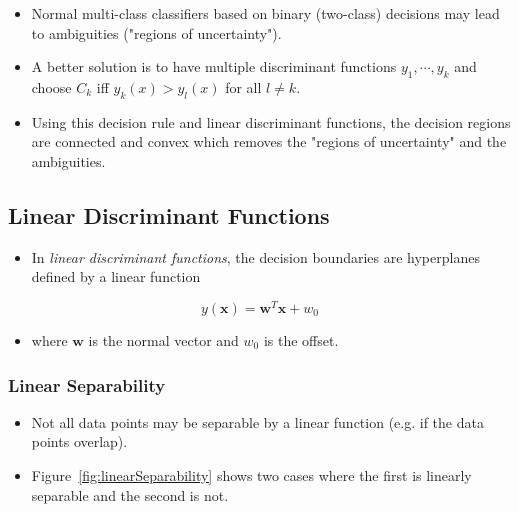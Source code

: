 \documentclass[a4paper, 11pt, accentcolor = tud3b]{tudreport}
\renewcommand{\vec}[1]{\mathbf{#1}}
\begin{document}
				\begin{itemize}
					\item Normal multi-class classifiers based on binary (two-class) decisions may lead to ambiguities ("regions of uncertainty").
					\item A better solution is to have multiple discriminant functions \( y_1, \cdots, y_k \) and choose \( C_k \) iff \( y_k(x) > y_l(x) \) for all \( l \neq k \).
					\item Using this decision rule and linear discriminant functions, the decision regions are connected and convex which removes the "regions of uncertainty" and the ambiguities.
				\end{itemize}

			\subsection{Linear Discriminant Functions}
				\begin{itemize}
					\item In \emph{linear discriminant functions}, the decision boundaries are hyperplanes defined by a linear function
				\end{itemize}
				\begin{equation}
					y(\vec{x}) = \vec{w}^T \vec{x} + w_0
				\end{equation}
				\begin{itemize}
					\item[] where \(\vec{w}\) is the normal vector and \(w_0\) is the offset.
				\end{itemize}

				\subsubsection{Linear Separability}
					\begin{itemize}
						\item Not all data points may be separable by a linear function (e.g. if the data points overlap).
						\item Figure~\ref{fig:linearSeparability} shows two cases where the first is linearly separable and the second is not.
					\end{itemize}
\end{document}
